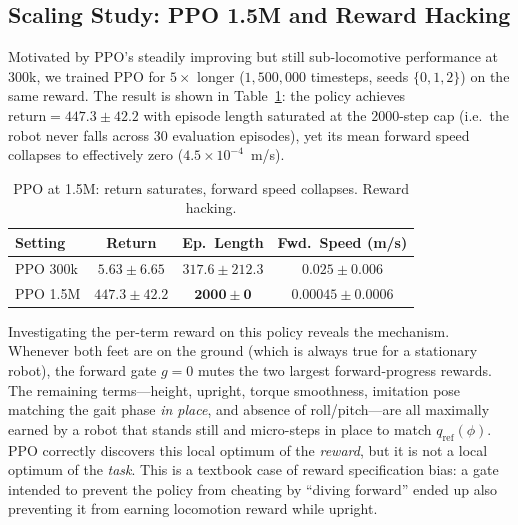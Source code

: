 \documentclass[letterpaper]{article}
\begin{document}
\subsection{Scaling Study: PPO 1.5M and Reward Hacking}
\label{sec:hacking}
Motivated by PPO's steadily improving but still sub-locomotive performance at 300k, we trained PPO for $5\times$ longer ($1{,}500{,}000$ timesteps, seeds $\{0,1,2\}$) on the same reward. The result is shown in Table~\ref{tab:hacking}: the policy achieves $\text{return}=447.3\pm 42.2$ with episode length saturated at the $2000$-step cap (i.e.\ the robot never falls across $30$ evaluation episodes), yet its mean forward speed collapses to effectively zero ($4.5\times10^{-4}$~m/s).

\begin{table}[t]
\centering
\small
\caption{PPO at 1.5M: return saturates, forward speed collapses. Reward hacking.}
\label{tab:hacking}
\begin{tabular}{lccc}
\toprule
Setting & Return & Ep.~Length & Fwd.~Speed (m/s) \\
\midrule
PPO 300k & $5.63 \pm 6.65$ & $317.6 \pm 212.3$ & $\mathbf{0.025 \pm 0.006}$ \\
PPO 1.5M & $\mathbf{447.3 \pm 42.2}$ & $\mathbf{2000 \pm 0}$ & $0.00045 \pm 0.0006$ \\
\bottomrule
\end{tabular}
\end{table}

Investigating the per-term reward on this policy reveals the mechanism. Whenever both feet are on the ground (which is always true for a stationary robot), the forward gate $g=0$ mutes the two largest forward-progress rewards. The remaining terms---height, upright, torque smoothness, imitation pose matching the gait phase \emph{in place}, and absence of roll/pitch---are all maximally earned by a robot that stands still and micro-steps in place to match $q_{\text{ref}}(\phi)$. PPO correctly discovers this local optimum of the \emph{reward}, but it is not a local optimum of the \emph{task}. This is a textbook case of reward specification bias: a gate intended to prevent the policy from cheating by ``diving forward'' ended up also preventing it from earning locomotion reward while upright.
\end{document}
